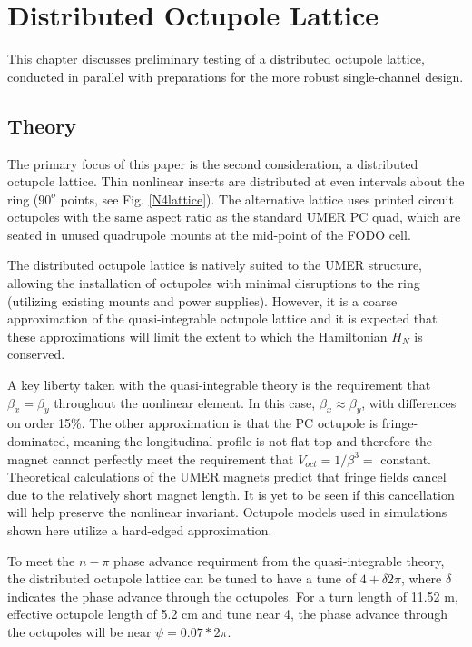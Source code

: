 
\renewcommand{\thechapter}{6}

\chapter{Distributed Octupole Lattice}




This chapter discusses preliminary testing of a distributed octupole lattice, conducted in parallel with preparations for the more robust single-channel design.

\section{Theory}

The primary focus of this paper is the second consideration, a distributed octupole lattice. Thin nonlinear inserts are distributed at even intervals about the ring ($90^o$ points, see Fig. \ref{N4lattice}).  The alternative lattice uses printed circuit octupoles with the same aspect ratio as the standard UMER PC quad, which are seated in unused quadrupole mounts at the mid-point of the FODO cell. 

The distributed octupole lattice is natively suited to the UMER structure, allowing the installation of octupoles with minimal disruptions to the ring (utilizing existing mounts and power supplies). However, it is a coarse approximation of the quasi-integrable octupole lattice and it is expected that these approximations will limit the extent to which the Hamiltonian $H_N$ is conserved.

A key liberty taken with the quasi-integrable theory is the requirement that $\beta_x=\beta_y$ throughout the nonlinear element. In this case, $\beta_x \approx \beta_y$, with differences on order 15\%. The other approximation is that the PC octupole is fringe-dominated, meaning the longitudinal profile is not flat top and therefore the magnet cannot perfectly meet the requirement that $V_{oct} = 1/\beta^3 =$ constant. Theoretical calculations of the UMER magnets predict that fringe fields cancel due to the relatively short magnet length.\cite{VenturiniThesis} It is yet to be seen if this cancellation will help preserve the nonlinear invariant. Octupole models used in simulations shown here utilize a hard-edged approximation. 

To meet the $n-\pi$ phase advance requirment from the quasi-integrable theory, the distributed octupole lattice can be tuned to have a tune of $4+\delta 2\pi$, where $\delta$ indicates the phase advance through the octupoles. For a turn length of 11.52 m, effective octupole length of 5.2 cm and tune near 4, the phase advance through the octupoles will be near $\psi = 0.07 *2\pi$. 





